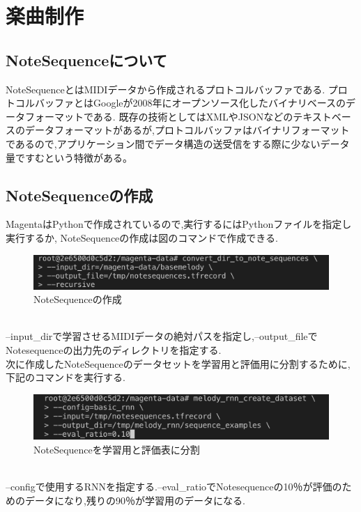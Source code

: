 \chapter{楽曲制作}
\section{NoteSequenceについて}
NoteSequenceとはMIDIデータから作成されるプロトコルバッファである.
プロトコルバッファとはGoogleが2008年にオープンソース化したバイナリベースのデータフォーマットである.
既存の技術としてはXMLやJSONなどのテキストベースのデータフォーマットがあるが,プロトコルバッファはバイナリフォーマットであるので,アプリケーション間でデータ構造の送受信をする際に少ないデータ量ですむという特徴がある。
\section{NoteSequenceの作成}
MagentaはPythonで作成されているので,実行するにはPythonファイルを指定し実行するか,
NoteSequenceの作成は図のコマンドで作成できる.
\begin{figure}[!ht]
    \begin{screen}
    \begin{center}
        \includegraphics[scale=0.7, clip]{./img/Notesequence_make.png}
        \caption{NoteSequenceの作成}
        \label{fig:NoteSequenceの作成}
    \end{center}
    \end{screen}
\end{figure}\\
--input\_dirで学習させるMIDIデータの絶対パスを指定し,--output\_fileでNotesequenceの出力先のディレクトリを指定する.\\
次に作成したNoteSequenceのデータセットを学習用と評価用に分割するために,下記のコマンドを実行する.
\begin{figure}[!ht]
    \begin{screen}
    \begin{center}
        \includegraphics[scale=0.7, clip]{./img/Notesequence_split.png}
        \caption{NoteSequenceを学習用と評価表に分割}
        \label{fig:NoteSequenceを学習用と評価表に分割}
    \end{center}
    \end{screen}
\end{figure}\\
--configで使用するRNNを指定する.--eval\_ratioでNotesequenceの10％が評価のためのデータになり,残りの90％が学習用のデータになる.\\
\newpage
